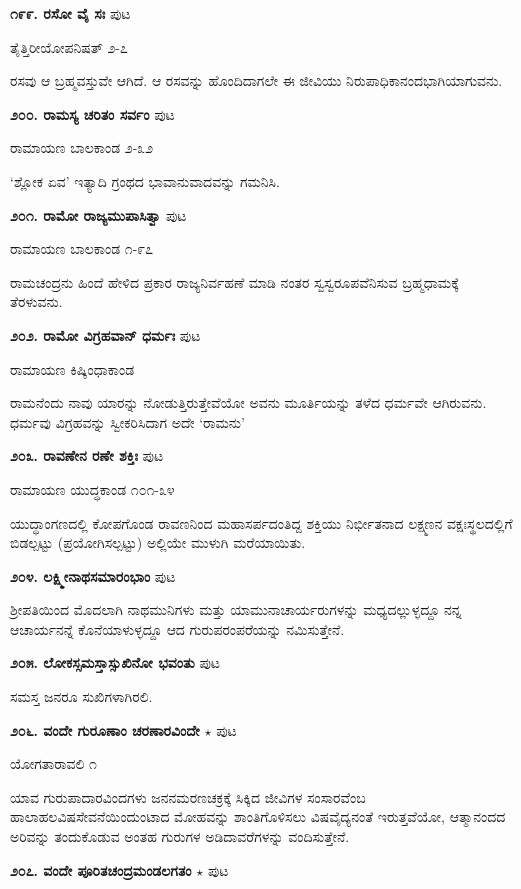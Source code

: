 \medskip
\noindent\textbf{೧೯೯. ರಸೋ ವೈ ಸಃ} \hfill ಪುಟ \pageref{76}

\hfill ತೈತ್ತಿರೀಯೋಪನಿಷತ್ ೨-೭

ರಸವು ಆ ಬ್ರಹ್ಮವಸ್ತುವೇ ಆಗಿದೆ. ಆ ರಸವನ್ನು ಹೊಂದಿದಾಗಲೇ ಈ ಜೀವಿಯು ನಿರುಪಾಧಿಕಾನಂದಭಾಗಿಯಾಗುವನು.

\medskip
\noindent\textbf{೨೦೦. ರಾಮಸ್ಯ ಚರಿತಂ ಸರ್ವಂ} \hfill ಪುಟ \pageref{204}

\hfill ರಾಮಾಯಣ ಬಾಲಕಾಂಡ ೨-೩೨

`ಶ್ಲೋಕ ಏವ' ಇತ್ಯಾದಿ ಗ್ರಂಥದ ಭಾವಾನುವಾದವನ್ನು ಗಮನಿಸಿ.

\medskip
\noindent\textbf{೨೦೧. ರಾಮೋ ರಾಜ್ಯಮುಪಾಸಿತ್ವಾ} \hfill ಪುಟ \pageref{253}

\hfill ರಾಮಾಯಣ ಬಾಲಕಾಂಡ ೧-೯೭

ರಾಮಚಂದ್ರನು ಹಿಂದೆ ಹೇಳಿದ ಪ್ರಕಾರ ರಾಜ್ಯನಿರ್ವಹಣೆ ಮಾಡಿ ನಂತರ ಸ್ವಸ್ವರೂಪವೆನಿಸುವ ಬ್ರಹ್ಮಧಾಮಕ್ಕೆ ತೆರಳುವನು.

\medskip
\noindent\textbf{೨೦೨. ರಾಮೋ ವಿಗ್ರಹವಾನ್ ಧರ್ಮಃ} \hfill ಪುಟ \pageref{247}

\hfill ರಾಮಾಯಣ ಕಿಷ್ಕಿಂಧಾಕಾಂಡ

ರಾಮನೆಂದು ನಾವು ಯಾರನ್ನು ನೋಡುತ್ತಿರುತ್ತೇವೆಯೋ ಅವನು ಮೂರ್ತಿಯನ್ನು ತಳೆದ ಧರ್ಮವೇ ಆಗಿರುವನು. ಧರ್ಮವು ವಿಗ್ರಹವನ್ನು ಸ್ವೀಕರಿಸಿದಾಗ ಅದೇ `ರಾಮನು'

\medskip
\noindent\textbf{೨೦೩. ರಾವಣೇನ ರಣೇ ಶಕ್ತಿಃ} \hfill ಪುಟ \pageref{120}

\hfill ರಾಮಾಯಣ ಯುದ್ಧಕಾಂಡ ೧೦೧-೩೪

ಯುದ್ಧಾಂಗಣದಲ್ಲಿ ಕೋಪಗೊಂಡ ರಾವಣನಿಂದ ಮಹಾಸರ್ಪದಂತಿದ್ದ ಶಕ್ತಿಯು ನಿರ್ಭೀತನಾದ ಲಕ್ಷ್ಮಣನ ವಕ್ಷಃಸ್ಥಲದಲ್ಲಿಗೆ ಬಿಡಲ್ಪಟ್ಟು (ಪ್ರಯೋಗಿಸಲ್ಪಟ್ಟು) ಅಲ್ಲಿಯೇ ಮುಳುಗಿ ಮರೆಯಾಯಿತು.

\medskip
\noindent\textbf{೨೦೪. ಲಕ್ಷ್ಮೀನಾಥಸಮಾರಂಭಾಂ} \hfill ಪುಟ \pageref{48}

\hfill ಶ್ರೀಪತಿಯಿಂದ ಮೊದಲಾಗಿ ನಾಥಮುನಿಗಳು ಮತ್ತು ಯಾಮುನಾಚಾರ್ಯರುಗಳನ್ನು ಮಧ್ಯದಲ್ಲುಳ್ಳದ್ದೂ ನನ್ನ ಆಚಾರ್ಯನನ್ನೆ ಕೊನೆಯಾಳುಳ್ಳದ್ದೂ ಆದ ಗುರುಪರಂಪರೆಯನ್ನು ನಮಿಸುತ್ತೇನೆ.

\medskip
\noindent\textbf{೨೦೫. ಲೋಕಸ್ಸಮಸ್ತಾಸ್ಸುಖಿನೋ ಭವಂತು} \hfill ಪುಟ \pageref{193}

\hfill ಸಮಸ್ತ ಜನರೂ ಸುಖಿಗಳಾಗಿರಲಿ.

\medskip
\noindent\textbf{೨೦೬. ವಂದೇ ಗುರೂಣಾಂ ಚರಣಾರವಿಂದೇ} $\star$ \hfill ಪುಟ \pageref{180}

\hfill ಯೋಗತಾರಾವಲಿ ೧

ಯಾವ ಗುರುಪಾದಾರವಿಂದಗಳು ಜನನಮರಣಚಕ್ರಕ್ಕೆ  ಸಿಕ್ಕಿದ ಜೀವಿಗಳ ಸಂಸಾರವೆಂಬ ಹಾಲಾಹಲವಿಷಸೇವನೆಯಿಂದುಂಟಾದ ಮೋಹವನ್ನು ಶಾಂತಿಗೊಳಿಸಲು ವಿಷವೈದ್ಯನಂತೆ ಇರುತ್ತವೆಯೋ, ಆತ್ಮಾನಂದದ ಅರಿವನ್ನು ತಂದುಕೊಡುವ ಅಂತಹ ಗುರುಗಳ ಅಡಿದಾವರೆಗಳನ್ನು ವಂದಿಸುತ್ತೇನೆ.

\medskip
\noindent\textbf{೨೦೭. ವಂದೇ ಪೂರಿತಚಂದ್ರಮಂಡಲಗತಂ} $\star$ \hfill ಪುಟ \pageref{32}

